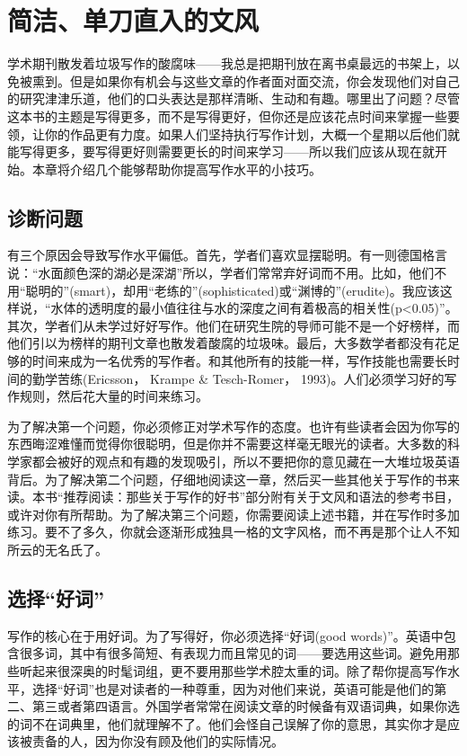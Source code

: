 \chapter{简洁、单刀直入的文风}
学术期刊散发着垃圾写作的酸腐味——我总是把期刊放在离书桌最远的书架上，以免被熏到。但是如果你有机会与这些文章的作者面对面交流，你会发现他们对自己的研究津津乐道，他们的口头表达是那样清晰、生动和有趣。哪里出了问题？尽管这本书的主题是写得更多，而不是写得更好，但你还是应该花点时间来掌握一些要领，让你的作品更有力度。如果人们坚持执行写作计划，大概一个星期以后他们就能写得更多，要写得更好则需要更长的时间来学习——所以我们应该从现在就开始。本章将介绍几个能够帮助你提高写作水平的小技巧。

\section{诊断问题}
有三个原因会导致写作水平偏低。首先，学者们喜欢显摆聪明。有一则德国格言说：“水面颜色深的湖必是深湖”所以，学者们常常弃好词而不用。比如，他们不用“聪明的”(smart)，却用“老练的”(sophisticated)或“渊博的”(erudite)。我应该这样说，“水体的透明度的最小值往往与水的深度之间有着极高的相关性(p<0.05)”。其次，学者们从未学过好好写作。他们在研究生院的导师可能不是一个好榜样，而他们引以为榜样的期刊文章也散发着酸腐的垃圾味。最后，大多数学者都没有花足够的时间来成为一名优秀的写作者。和其他所有的技能一样，写作技能也需要长时间的勤学苦练(Ericsson， Krampe \& Tesch-Romer， 1993)。人们必须学习好的写作规则，然后花大量的时间来练习。

为了解决第一个问题，你必须修正对学术写作的态度。也许有些读者会因为你写的东西晦涩难懂而觉得你很聪明，但是你并不需要这样毫无眼光的读者。大多数的科学家都会被好的观点和有趣的发现吸引，所以不要把你的意见藏在一大堆垃圾英语背后。为了解决第二个问题，仔细地阅读这一章，然后买一些其他关于写作的书来读。本书“推荐阅读：那些关于写作的好书”部分附有关于文风和语法的参考书目，或许对你有所帮助。为了解决第三个问题，你需要阅读上述书籍，并在写作时多加练习。要不了多久，你就会逐渐形成独具一格的文字风格，而不再是那个让人不知所云的无名氏了。

\section{选择“好词”}
写作的核心在于用好词。为了写得好，你必须选择“好词(good words)”。英语中包含很多词，其中有很多简短、有表现力而且常见的词——要选用这些词。避免用那些听起来很深奥的时髦词组，更不要用那些学术腔太重的词。除了帮你提高写作水平，选择“好词”也是对读者的一种尊重，因为对他们来说，英语可能是他们的第二、第三或者第四语言。外国学者常常在阅读文章的时候备有双语词典，如果你选的词不在词典里，他们就理解不了。他们会怪自己误解了你的意思，其实你才是应该被责备的人，因为你没有顾及他们的实际情况。

